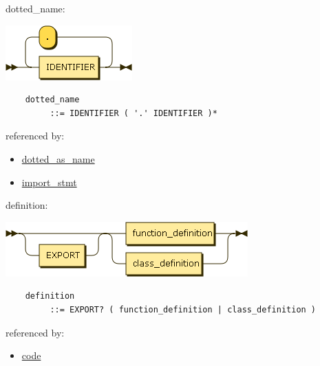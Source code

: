 \begin{minipage}{\textwidth}
    \protect\hypertarget{dotted_name}{}{dotted\_name:}

    \includegraphics[width=1.91667in,height=0.83333in]{diagram/dotted_name.png}

    \begin{verbatim}
    dotted_name
         ::= IDENTIFIER ( '.' IDENTIFIER )*
    \end{verbatim}

    referenced by:

    \begin{itemize}
            \tightlist
        \item
            \protect\hyperlink{dotted_as_name}{dotted\_as\_name}
        \item
            \protect\hyperlink{import_stmt}{import\_stmt}
    \end{itemize}

\end{minipage}

\begin{minipage}{\textwidth}
    \protect\hypertarget{definition}{}{definition:}

    \includegraphics[width=3.66667in,height=0.83333in]{diagram/definition.png}

    \begin{verbatim}
    definition
         ::= EXPORT? ( function_definition | class_definition )
    \end{verbatim}

    referenced by:

    \begin{itemize}
            \tightlist
        \item
            \protect\hyperlink{code}{code}
    \end{itemize}

\end{minipage}

